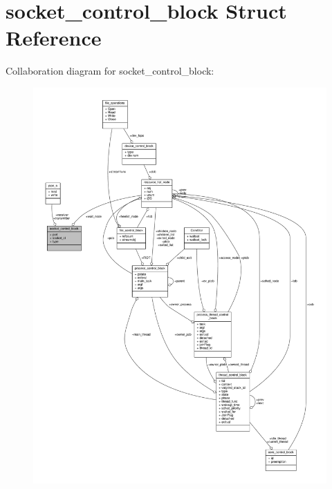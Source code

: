 \hypertarget{structsocket__control__block}{}\section{socket\+\_\+control\+\_\+block Struct Reference}
\label{structsocket__control__block}


Collaboration diagram for socket\+\_\+control\+\_\+block\+:
\nopagebreak
\begin{figure}[H]
\begin{center}
\leavevmode
\includegraphics[width=350pt]{structsocket__control__block__coll__graph}
\end{center}
\end{figure}
